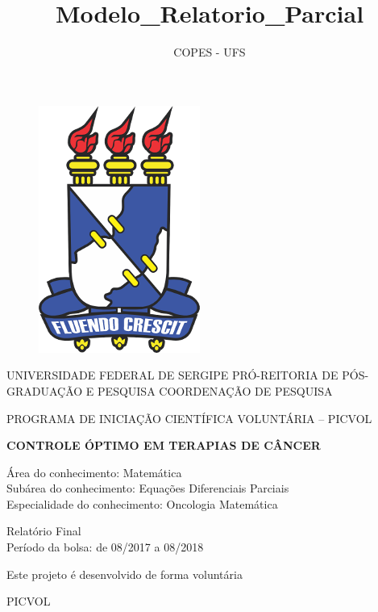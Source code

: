 \documentclass[12pt, a4paper]{article}
\author{COPES - UFS}
\title{Modelo_Relatorio_Parcial}
\date{}
\begin{document}
\begin{figure}[!h]
    \centering
    \includegraphics[scale=1.2]{ufs.png}

  \end{figure}

 \begin{center}
 
 \Large UNIVERSIDADE FEDERAL DE SERGIPE
PRÓ-REITORIA DE PÓS-GRADUAÇÃO E PESQUISA
COORDENAÇÃO DE PESQUISA
\vspace{10mm} 

\normalsize PROGRAMA DE INICIAÇÃO CIENTÍFICA VOLUNTÁRIA – PICVOL

\vspace{20mm}

\textbf{\Large CONTROLE ÓPTIMO EM TERAPIAS DE CÂNCER}

\vspace{20mm}
 {\normalsize Área do conhecimento: Matemática\\
Subárea do conhecimento: Equações Diferenciais Parciais\\
Especialidade do conhecimento: Oncologia Matemática\\}
\vspace{20mm}

{\normalsize Relatório Final\\
Período da bolsa: de 08/2017 a 08/2018}
\vspace{10mm}

 {\large Este projeto é desenvolvido de forma voluntária}
\vspace{10mm}

\large{PICVOL}


 \end{center}

 
\newpage
\end{document}
